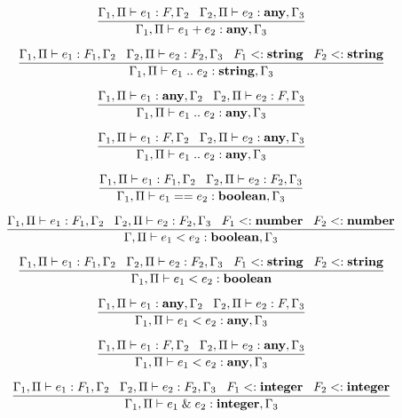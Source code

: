 \[
\dfrac{\Gamma_{1}, \Pi \vdash e_{1}:F, \Gamma_{2} \;\;\;
       \Gamma_{2}, \Pi \vdash e_{2}:\mathbf{any}, \Gamma_{3}}
      {\Gamma_{1}, \Pi \vdash e_{1} + e_{2}:\mathbf{any}, \Gamma_{3}}
\]

\[
\dfrac{\Gamma_{1}, \Pi \vdash e_{1}:F_{1}, \Gamma_{2} \;\;\;
       \Gamma_{2}, \Pi \vdash e_{2}:F_{2}, \Gamma_{3} \;\;\;
       F_{1} <: \mathbf{string} \;\;\;
       F_{2} <: \mathbf{string}}
      {\Gamma_{1}, \Pi \vdash e_{1} \; {..} \; e_{2}:\mathbf{string}, \Gamma_{3}}
\]

\[
\dfrac{\Gamma_{1}, \Pi \vdash e_{1}:\mathbf{any}, \Gamma_{2} \;\;\;
       \Gamma_{2}, \Pi \vdash e_{2}:F, \Gamma_{3}}
      {\Gamma_{1}, \Pi \vdash e_{1} \; {..} \; e_{2}:\mathbf{any}, \Gamma_{3}}
\]

\[
\dfrac{\Gamma_{1}, \Pi \vdash e_{1}:F, \Gamma_{2} \;\;\;
       \Gamma_{2}, \Pi \vdash e_{2}:\mathbf{any}, \Gamma_{3}}
      {\Gamma_{1}, \Pi \vdash e_{1} \; {..} \; e_{2}:\mathbf{any}, \Gamma_{3}}
\]

\[
\dfrac{\Gamma_{1}, \Pi \vdash e_{1}:F_{1}, \Gamma_{2} \;\;\;
       \Gamma_{2}, \Pi \vdash e_{2}:F_{2}, \Gamma_{3}}
      {\Gamma_{1}, \Pi \vdash e_{1} == e_{2}:\mathbf{boolean}, \Gamma_{3}}
\]

\[
\dfrac{\Gamma_{1}, \Pi \vdash e_{1}:F_{1}, \Gamma_{2} \;\;\;
       \Gamma_{2}, \Pi \vdash e_{2}:F_{2}, \Gamma_{3} \;\;\;
       F_{1} <: \mathbf{number} \;\;\;
       F_{2} <: \mathbf{number}}
      {\Gamma, \Pi \vdash e_{1} < e_{2}:\mathbf{boolean}, \Gamma_{3}}
\]

\[
\dfrac{\Gamma_{1}, \Pi \vdash e_{1}:F_{1}, \Gamma_{2} \;\;\;
       \Gamma_{2}, \Pi \vdash e_{2}:F_{2}, \Gamma_{3} \;\;\;
       F_{1} <: \mathbf{string} \;\;\;
       F_{2} <: \mathbf{string}}
      {\Gamma_{1}, \Pi \vdash e_{1} < e_{2}:\mathbf{boolean}}
\]

\[
\dfrac{\Gamma_{1}, \Pi \vdash e_{1}:\mathbf{any}, \Gamma_{2} \;\;\;
       \Gamma_{2}, \Pi \vdash e_{2}:F, \Gamma_{3}}
      {\Gamma_{1}, \Pi \vdash e_{1} < e_{2}:\mathbf{any}, \Gamma_{3}}
\]

\[
\dfrac{\Gamma_{1}, \Pi \vdash e_{1}:F, \Gamma_{2} \;\;\;
       \Gamma_{2}, \Pi \vdash e_{2}:\mathbf{any}, \Gamma_{3}}
      {\Gamma_{1}, \Pi \vdash e_{1} < e_{2}:\mathbf{any}, \Gamma_{3}}
\]

\[
\dfrac{\Gamma_{1}, \Pi \vdash e_{1}:F_{1}, \Gamma_{2} \;\;\;
       \Gamma_{2}, \Pi \vdash e_{2}:F_{2}, \Gamma_{3} \;\;\;
       F_{1} <: \mathbf{integer} \;\;\;
       F_{2} <: \mathbf{integer}}
      {\Gamma_{1}, \Pi \vdash e_{1} \;\&\; e_{2}:\mathbf{integer}, \Gamma_{3}}
\]

